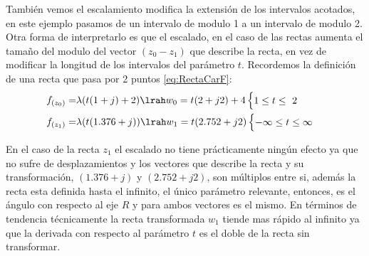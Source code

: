 También vemos el escalamiento modifica la extensión de los intervalos acotados, en este ejemplo pasamos de un intervalo de modulo 1 a un intervalo de modulo 2. Otra forma de interpretarlo es que el escalado, en el caso de las rectas aumenta el tamaño del modulo del vector $(z_0-z_1)$ que describe la recta, en vez de modificar la longitud de los intervalos del parámetro $t$. Recordemos la definición de una recta que pasa por 2 puntos \ref{eq:RectaCarF}:
\begin{equation}
    \begin{aligned}
        f_{(z_0)}=&\lambda(t(1+j)+2)\lrah w_0=t(2+j2)+4\begin{cases}
            1\leq t\leq\ 2
    \end{cases}\\
        f_{(z_1)}=&\lambda(t(1.376+j)) \lrah w_1=t(2.752+j2) \begin{cases}
            -\infty\leq t\leq\infty
    \end{cases}
    \end{aligned}
\end{equation}
\begin{figure}[H]
    \centering
    \begin{minipage}{0.39\textwidth}
         
    \end{minipage}
     \begin{minipage}{0.2\textwidth}
    \end{minipage}
    \begin{minipage}{0.39\textwidth}
         
    \end{minipage}
    \caption{}
\end{figure}
En el caso de la recta $z_1$ el escalado no tiene prácticamente ningún efecto ya que no sufre de desplazamientos y los vectores que describe la recta y su transformación, $(1.376+j)$ y $(2.752+j2)$, son múltiplos entre si, además la recta esta definida hasta el infinito, el único parámetro relevante, entonces, es el ángulo con respecto al eje $R$ y para ambos vectores es el mismo. En términos de tendencia técnicamente la recta transformada $w_1$ tiende mas rápido al infinito ya que la derivada con respecto al parámetro $t$ es el doble de la recta sin transformar.

